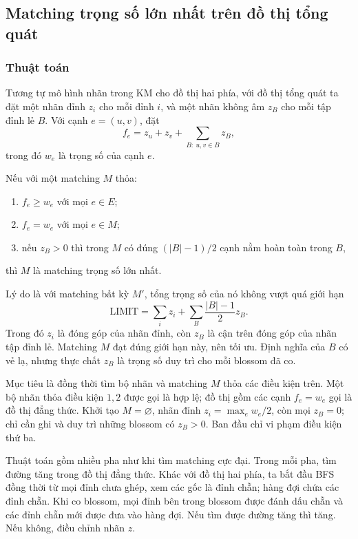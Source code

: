 \documentclass[11pt]{article}
\begin{document}
\subsection{Matching trọng số lớn nhất trên đồ thị tổng quát}

\subsubsection{Thuật toán}

Tương tự mô hình nhãn trong KM cho đồ thị hai phía, với đồ thị tổng quát ta đặt
một nhãn đỉnh \(z_i\) cho mỗi đỉnh \(i\), và một nhãn không âm \(z_B\) cho mỗi
tập đỉnh lẻ \(B\). Với cạnh \(e=(u,v)\), đặt
\[
  f_e=z_u+z_v+\sum_{B:\ u,v\in B} z_B,
\]
trong đó \(w_e\) là trọng số của cạnh \(e\).

Nếu với một matching \(M\) thỏa:
\begin{enumerate}
  \item \(f_e\ge w_e\) với mọi \(e\in E\);
  \item \(f_e=w_e\) với mọi \(e\in M\);
  \item nếu \(z_B>0\) thì trong \(M\) có đúng \((|B|-1)/2\) cạnh nằm hoàn toàn
  trong \(B\),
\end{enumerate}
thì \(M\) là matching trọng số lớn nhất.

Lý do là với matching bất kỳ \(M'\), tổng trọng số của nó không vượt quá giới
hạn
\[
  \mathrm{LIMIT}
  =\sum_i z_i+\sum_B \frac{|B|-1}{2}z_B.
\]
Trong đó \(z_i\) là đóng góp của nhãn đỉnh, còn \(z_B\) là cận trên đóng góp của
nhãn tập đỉnh lẻ. Matching \(M\) đạt đúng giới hạn này, nên tối ưu. Định nghĩa
của \(B\) có vẻ lạ, nhưng thực chất \(z_B\) là trọng số duy trì cho mỗi blossom
đã co.

Mục tiêu là đồng thời tìm bộ nhãn và matching \(M\) thỏa các điều kiện trên.
Một bộ nhãn thỏa điều kiện \(1,2\) được gọi là hợp lệ; đồ thị gồm các cạnh
\(f_e=w_e\) gọi là đồ thị đẳng thức. Khởi tạo \(M=\varnothing\), nhãn đỉnh
\(z_i=\max_e w_e/2\), còn mọi \(z_B=0\); chỉ cần ghi và duy trì những blossom có
\(z_B>0\). Ban đầu chỉ vi phạm điều kiện thứ ba.

Thuật toán gồm nhiều pha như khi tìm matching cực đại. Trong mỗi pha, tìm đường
tăng trong đồ thị đẳng thức. Khác với đồ thị hai phía, ta bắt đầu BFS đồng thời
từ mọi đỉnh chưa ghép, xem các gốc là đỉnh chẵn; hàng đợi chứa các đỉnh chẵn.
Khi co blossom, mọi đỉnh bên trong blossom được đánh dấu chẵn và các đỉnh chẵn
mới được đưa vào hàng đợi. Nếu tìm được đường tăng thì tăng. Nếu không, điều
chỉnh nhãn \(z\).
\end{document}
